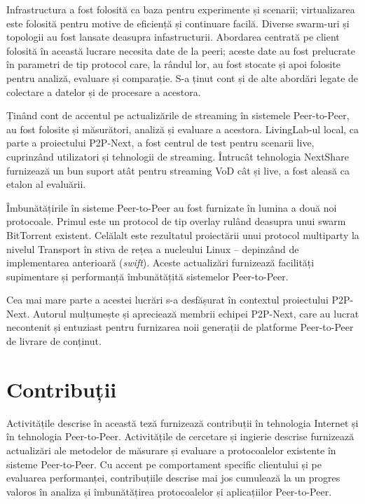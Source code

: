 Infrastructura a fost folosită ca baza pentru experimente și scenarii;
virtualizarea este folosită pentru motive de eficiență și continuare facilă.
Diverse swarm-uri și topologii au fost lansate deasupra infastructurii.
Abordarea centrată pe client folosită în această lucrare necesita date de la
peeri; aceste date au fost prelucrate în parametri de tip protocol care, la
rândul lor, au fost stocate și apoi folosite pentru analiză, evaluare și
comparație. S-a ținut cont și de alte abordări legate de colectare a
datelor și de procesare a acestora.

Ținând cont de accentul pe actualizările de streaming în sistemele
Peer-to-Peer, au fost folosite și măsurători, analiză și evaluare a acestora.
LivingLab-ul local, ca parte a proiectului P2P-Next, a fost centrul de test
pentru scenarii live, cuprinzând utilizatori și tehnologii de streaming.
Întrucât tehnologia NextShare furnizează un bun suport atât pentru streaming
VoD cât și live, a fost aleasă ca etalon al evaluării.

Îmbunătățirile în sisteme Peer-to-Peer au fost furnizate în lumina a două noi
protocoale. Primul este un protocol de tip overlay rulând deasupra unui swarm
BitTorrent existent. Celălalt este rezultatul proiectării unui protocol
multiparty la nivelul Transport în stiva de rețea a nucleului Linux --
depinzând de implementarea anterioară (\textit{swift}). Aceste actualizări
furnizează facilități supimentare și performanță îmbunătățită sistemelor
Peer-to-Peer.

Cea mai mare parte a acestei lucrări s-a desfășurat în contextul proiectului
P2P-Next. Autorul mulțumește și apreciează membrii echipei P2P-Next, care au
lucrat necontenit și entuziast pentru furnizarea noii generații de platforme
Peer-to-Peer de livrare de conținut.

\section{Contribuții}
\label{sec:conclusion:contributions}

Activitățile descrise în această teză furnizează contribuții în
tehnologia Internet și în tehnologia Peer-to-Peer. Activitățile de cercetare
și ingierie descrise furnizează actualizări ale metodelor de măsurare și
evaluare a protocoalelor existente în sisteme Peer-to-Peer. Cu accent pe
comportament specific clientului și pe evaluarea performanței, contribuțiile
descrise mai jos cumulează la un progres valoros în analiza și îmbunătățirea
protocoalelor și aplicațiilor Peer-to-Peer.

